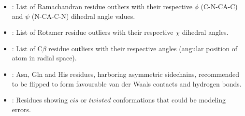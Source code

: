 \begin{itemize}
\begin{itemize}
\begin{itemize}
\begin{itemize}
          \item {}: List of Ramachandran residue outliers with their respective $\phi$ (C-N-CA-C) and $\psi$ (N-CA-C-N) dihedral angle values.
          \item {}: List of Rotamer residue outliers with their respective $\chi$ dihedral angles.
          \item {}: List of C{$\beta$} residue outliers with their respective angles (angular position of  atom in radial space).
          \item {}: Asn, Gln and His residues, harboring asymmetric sidechains, recommended to be flipped to form favourable van der Waals contacts and hydrogen bonds.
          \item {}: Residues showing $cis$ or $twisted$ conformations that could be modeling errors.
         \end{itemize}


\end{itemize}
\end{itemize}
\end{itemize}
